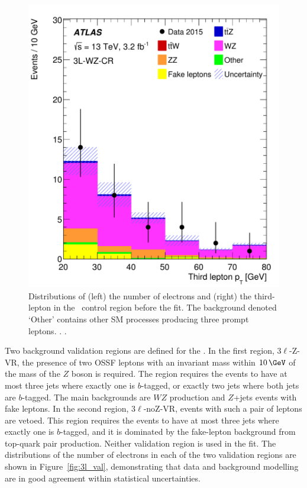 \begin{figure}[htbp]
\includegraphics[width=\twofigwidth]{CRWZpT3lep}
\caption{\label{fig:3l_wzcr} Distributions of (left) the number of electrons
and (right) the third-lepton \pt in the \TLCR\ control region before the fit.  
The background
denoted `Other' contains other SM processes producing three prompt leptons.
\hatch. \oflor.}
\end{figure}

Two background validation regions are defined for the \TLC.  In the first
region, $3\ell$-Z-VR, the presence of two OSSF leptons with an invariant mass
within $10\,\GeV$ of the mass of the $Z$ boson is required.  The region requires
the events to have at most three jets where exactly one is $b$-tagged, or
exactly two jets where both jets are $b$-tagged.  The main backgrounds are $WZ$
production and $Z$+jets events with fake leptons.  In the second region,
$3\ell$-noZ-VR, events with such a pair of leptons are vetoed.  This region
requires the events to have at most three jets where exactly one is $b$-tagged,
and it is dominated by the fake-lepton background from top-quark pair production.
Neither validation region is used in the fit.  The distributions of the number
of electrons in each of the two validation regions are shown in
Figure~\ref{fig:3l_val}, demonstrating that data and background modelling are 
in good agreement within statistical uncertainties.

